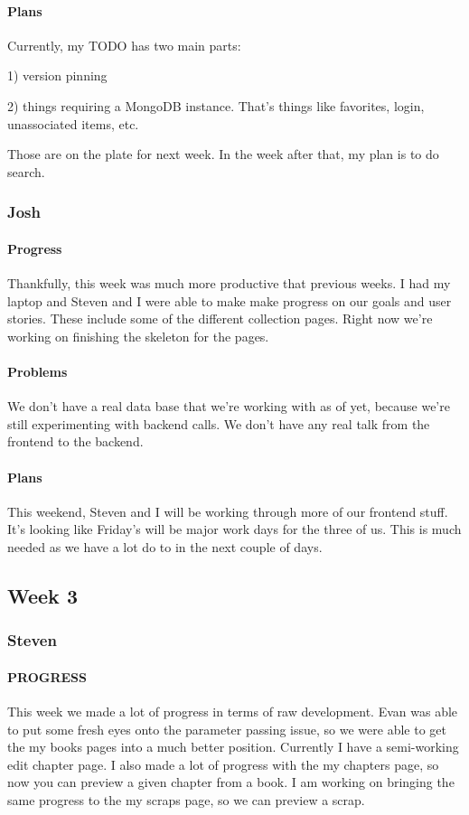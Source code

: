 \documentclass[onecolumn, draftclsnofoot,10pt, compsoc]{IEEEtran}
\begin{document}
	\paragraph{Plans}
	Currently, my TODO has two main parts:
	
	1) version pinning
	
	2) things requiring a MongoDB instance. That's things like favorites, login, unassociated items, etc.
	
	Those are on the plate for next week. In the week after that, my plan is to do search.
	
	\subsubsection{Josh}
	
	
	\paragraph{Progress}
	Thankfully, this week was much more productive that previous weeks. I had my laptop and Steven and I were able to make make progress on our goals and user stories. These include some of the different collection pages. Right now we're working on finishing the skeleton for the pages.
	
	
	\paragraph{Problems}
	We don't have a real data base that we're working with as of yet, because we're still experimenting with backend calls. We don't have any real talk from the frontend to the backend. 
	
	\paragraph{Plans}
	This weekend, Steven and I will be working through more of our frontend stuff. It's looking like Friday's will be major work days for the three of us. This is much needed as we have a lot do to in the next couple of days.
	
\subsection{Week 3}
	\subsubsection{Steven}
	
	\paragraph{PROGRESS}
	This week we made a lot of progress in terms of raw development. Evan was able to put some fresh eyes onto the parameter passing issue, so we were able to get the my books pages into a much better position. Currently I have a semi-working edit chapter page. I also made a lot of progress with the my chapters page, so now you can preview a given chapter from a book. I am working on bringing the same progress to the my scraps page, so we can preview a scrap.
	
\end{document}
